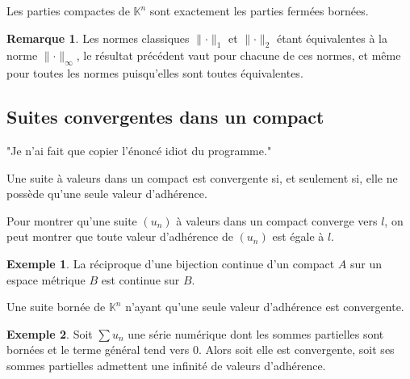\documentclass[french]{article}
\newcommand{\N}{\mathbb{N}}
\newcommand{\K}{\mathbb{K}}
\newcommand{\inv}{^{-1}}
\theoremstyle{plain}
\theoremstyle{definition}
\newtheorem*{ex}{Exemple}
\newtheorem*{rmq}{Remarque}
\theoremstyle{remark}
\begin{document}
\begin{thm}%
	Les parties compactes de $\K^n$ sont exactement les parties fermées bornées.
\end{thm}

\begin{rmq}
	Les normes classiques $\lVert\cdot\rVert_1$ et $\lVert\cdot\rVert_2$ étant équivalentes à la norme $\lVert\cdot\rVert_\infty$, le résultat précédent vaut pour chacune de ces normes, et même pour toutes les normes puisqu'elles sont toutes équivalentes.
\end{rmq}

\subsection{Suites convergentes dans un compact}

"Je n'ai fait que copier l'énoncé idiot du programme."

\begin{thm}%
	Une suite à valeurs dans un compact est convergente si, et seulement si, elle ne possède qu'une seule valeur d'adhérence.
\end{thm}

\begin{met}
	Pour montrer qu'une suite $(u_n)$ à valeurs dans un compact converge vers $l$, on peut montrer que toute valeur d'adhérence de $(u_n)$ est égale à $l$.
\end{met}

\begin{ex}
	La réciproque d'une bijection continue d'un compact $A$ sur un espace métrique $B$ est continue sur $B$.
\end{ex}

\begin{cor}%
	Une suite bornée de $\K^n$ n'ayant qu'une seule valeur d'adhérence est convergente.
\end{cor}

\begin{ex}
	Soit $\displaystyle\sum u_n$ une série numérique dont les sommes partielles sont bornées et le terme général tend vers $0$. Alors soit elle est convergente, soit ses sommes partielles admettent une infinité de valeurs d'adhérence.
\end{ex}
\end{document}
